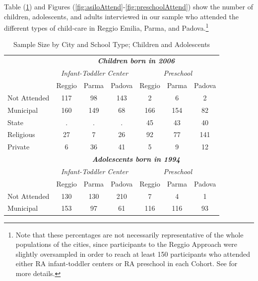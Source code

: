 \documentclass[12pt]{article}
\begin{document}
Table (\ref{tab:sample-adol}) and Figures (\ref{fig:asiloAttend}-\ref{fig:preschoolAttend}) show the number of children, adolescents, and adults interviewed in our sample who attended the different types of child-care in Reggio Emilia, Parma, and Padova.\footnote{Note that these percentages are not necessarily representative of the whole populations of the cities, since participants to the Reggio Approach were slightly oversampled in order to reach at least 150 participants who attended either RA infant-toddler centers or RA preschool in each Cohort. See \citep{Biroli2015} for more details.}

\begin{table}[ht]
\caption{Sample Size by City and School Type; Children and Adolescents}
\label{tab:sample-adol}

\begin{center}
\begin{tabular}{l ccc|ccc}
\hline\hline
 & \multicolumn{6}{c}{\textit{\textbf{Children born in 2006}}} \\ 
 & \multicolumn{3}{c}{\textit{Infant-Toddler Center}} & \multicolumn{3}{c}{\textit{Preschool}} \\ 
 & Reggio & Parma & Padova & Reggio & Parma & Padova \\ \hline
Not Attended    & 117 &  98 & 143 &   2 &   6 &   2 \\ 
Municipal       & 160 & 149 &  68 & 166 & 154 &  82 \\ 
State           &   . &   . &   . &  45 &  43 &  40 \\ 
Religious       &  27 &   7 &  26 &  92 &  77 & 141 \\ 
Private         &   6 &  36 &  41 &   5 &   9 &  12 \\ \hline 
%
%
\rule{0pt}{1.2\normalbaselineskip}
 & \multicolumn{6}{c}{\textit{\textbf{Adolescents born in 1994}}} \\ 

 & \multicolumn{3}{c}{\textit{Infant-Toddler Center}} & \multicolumn{3}{c}{\textit{Preschool}} \\ 

 & Reggio & Parma & Padova & Reggio & Parma & Padova \\ \hline
Not Attended    & 130 & 130 & 210 &   7 &   4 &   1 \\ 
Municipal       & 153 &  97 &  61 & 116 & 116 &  93 \\ 




\end{tabular}
\end{center}
\end{table}
\end{document}
